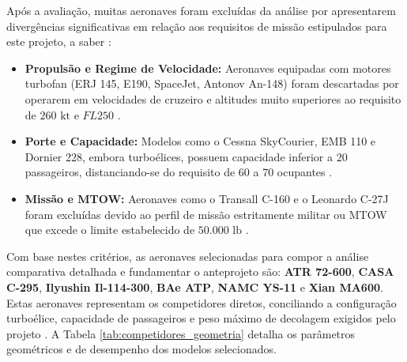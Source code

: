 Após a avaliação, muitas aeronaves foram excluídas da análise por apresentarem divergências significativas em relação aos requisitos de missão estipulados para este projeto, a saber \cite{medeiros2026}:

\begin{itemize}
    \item \textbf{Propulsão e Regime de Velocidade:} Aeronaves equipadas com motores turbofan (ERJ 145, E190, SpaceJet, Antonov An-148) foram descartadas por operarem em velocidades de cruzeiro e altitudes muito superiores ao requisito de $260 \text{ kt}$ e $FL250$ \cite{medeiros2026}.
    \item \textbf{Porte e Capacidade:} Modelos como o Cessna SkyCourier, EMB 110 e Dornier 228, embora turboélices, possuem capacidade inferior a 20 passageiros, distanciando-se do requisito de 60 a 70 ocupantes \cite{medeiros2026}.
    \item \textbf{Missão e MTOW:} Aeronaves como o Transall C-160 e o Leonardo C-27J foram excluídas devido ao perfil de missão estritamente militar ou MTOW que excede o limite estabelecido de $50.000 \text{ lb}$ \cite{medeiros2026}.
\end{itemize}

Com base nestes critérios, as aeronaves selecionadas para compor a análise comparativa detalhada e fundamentar o anteprojeto são: \textbf{ATR 72-600}, \textbf{CASA C-295}, \textbf{Ilyushin Il-114-300}, \textbf{BAe ATP}, \textbf{NAMC YS-11} e \textbf{Xian MA600}. Estas aeronaves representam os competidores diretos, conciliando a configuração turboélice, capacidade de passageiros e peso máximo de decolagem exigidos pelo projeto \cite{medeiros2026}. A Tabela \ref{tab:competidores_geometria} detalha os parâmetros geométricos e de desempenho dos modelos selecionados. 

